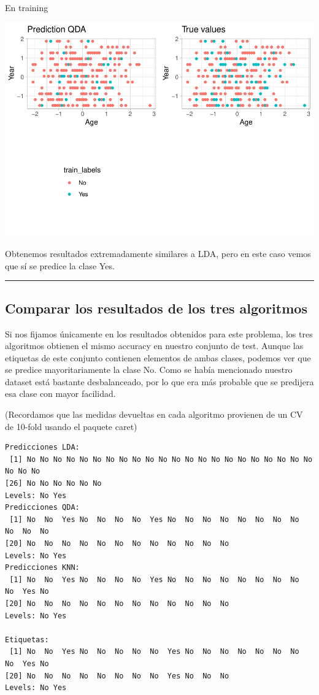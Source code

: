 \documentclass[
]{article}
\begin{document}
En training

\begin{center}\includegraphics{Clasificacion_files/figure-latex/unnamed-chunk-32-1} \end{center}

Obtenemos resultados extremadamente similares a LDA, pero en este caso
vemos que sí se predice la clase Yes.

\begin{center}\rule{0.5\linewidth}{0.5pt}\end{center}

\hypertarget{comparar-los-resultados-de-los-tres-algoritmos}{%
\subsection{Comparar los resultados de los tres
algoritmos}\label{comparar-los-resultados-de-los-tres-algoritmos}}

Si nos fijamos únicamente en los resultados obtenidos para este
problema, los tres algoritmos obtienen el mismo accuracy en nuestro
conjunto de test. Aunque las etiquetas de este conjunto contienen
elementos de ambas clases, podemos ver que se predice mayoritariamente
la clase No. Como se había mencionado nuestro dataset está bastante
desbalanceado, por lo que era más probable que se predijera esa clase
con mayor facilidad.

(Recordamos que las medidas devueltas en cada algoritmo provienen de un
CV de 10-fold usando el paquete caret)

\begin{verbatim}
Predicciones LDA:
 [1] No No No No No No No No No No No No No No No No No No No No No No No No No
[26] No No No No No No
Levels: No Yes
Predicciones QDA:
 [1] No  No  Yes No  No  No  No  Yes No  No  No  No  No  No  No  No  No  No  No 
[20] No  No  No  No  No  No  No  No  No  No  No  No 
Levels: No Yes
Predicciones KNN:
 [1] No  No  Yes No  No  No  No  Yes No  No  No  No  No  No  No  No  No  Yes No 
[20] No  No  No  No  No  No  No  No  No  No  No  No 
Levels: No Yes

Etiquetas:
 [1] No  No  Yes No  No  No  No  No  Yes No  No  No  No  No  No  No  No  Yes No 
[20] No  No  No  No  No  No  No  No  Yes No  No  No 
Levels: No Yes
\end{verbatim}
\end{document}
